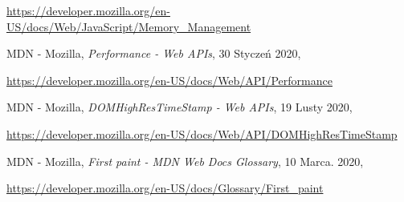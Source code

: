 \begin{thebibliography}{99}
\url{https://developer.mozilla.org/en-US/docs/Web/JavaScript/Memory_Management}

MDN - Mozilla,
\emph{Performance - Web APIs},
30 Styczeń 2020,

\url{https://developer.mozilla.org/en-US/docs/Web/API/Performance}

MDN - Mozilla,
\emph{DOMHighResTimeStamp - Web APIs},
19 Lusty 2020,

\url{https://developer.mozilla.org/en-US/docs/Web/API/DOMHighResTimeStamp}

MDN - Mozilla,
\emph{First paint - MDN Web Docs Glossary},
10 Marca. 2020,

\url{https://developer.mozilla.org/en-US/docs/Glossary/First_paint}


\end{thebibliography}


